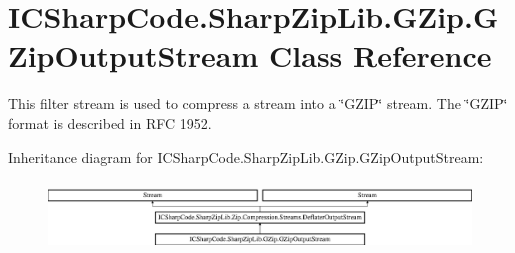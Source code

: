 \hypertarget{class_i_c_sharp_code_1_1_sharp_zip_lib_1_1_g_zip_1_1_g_zip_output_stream}{}\section{I\+C\+Sharp\+Code.\+Sharp\+Zip\+Lib.\+G\+Zip.\+G\+Zip\+Output\+Stream Class Reference}
\label{class_i_c_sharp_code_1_1_sharp_zip_lib_1_1_g_zip_1_1_g_zip_output_stream}


This filter stream is used to compress a stream into a \char`\"{}\+G\+Z\+I\+P\char`\"{} stream. The \char`\"{}\+G\+Z\+I\+P\char`\"{} format is described in R\+FC 1952.  


Inheritance diagram for I\+C\+Sharp\+Code.\+Sharp\+Zip\+Lib.\+G\+Zip.\+G\+Zip\+Output\+Stream\+:\begin{figure}[H]
\begin{center}
\leavevmode
\includegraphics[height=1.891892cm]{class_i_c_sharp_code_1_1_sharp_zip_lib_1_1_g_zip_1_1_g_zip_output_stream}
\end{center}
\end{figure}
